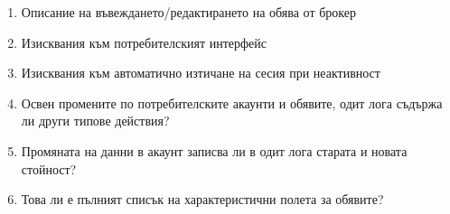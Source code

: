 \documentclass[]{article}
\begin{document}
\begin{enumerate}[I.]
{\begin{enumerate}[1.]
			\item Описание на въвеждането/редактирането на обява от брокер
			\item Изисквания към потребителският интерфейс
			\item Изисквания към автоматично изтичане на сесия при неактивност
			\item Освен промените по потребителските акаунти и обявите, одит лога съдържа ли други типове действия?
			\item Промяната на данни в акаунт записва ли в одит лога старата и новата стойност?
			\item Това ли е пълният списък на характеристични полета за обявите?
		\end{enumerate}
	}
\end{enumerate}
\end{document}
